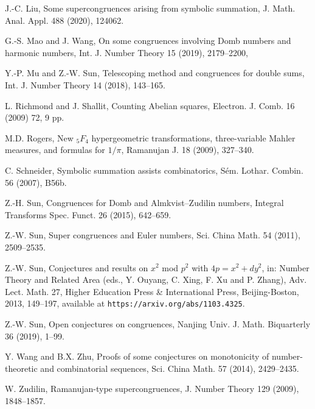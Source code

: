 \documentclass[12pt]{article}
\numberwithin{equation}{section}
\begin{document}
\begin{thebibliography}{99}
J.-C. Liu, Some supercongruences arising from symbolic summation,
J. Math. Anal. Appl. 488 (2020), 124062.

G.-S. Mao and J. Wang, On some congruences involving Domb numbers and harmonic numbers, Int. J. Number Theory 15 (2019), 2179--2200,

Y.-P. Mu and Z.-W. Sun, Telescoping method and congruences for double sums, Int. J. Number Theory 14 (2018), 143--165.

L. Richmond and J. Shallit, Counting Abelian squares, Electron. J. Comb. 16 (2009) 72, 9 pp.

M.D. Rogers, New $_5F_4$ hypergeometric transformations, three-variable Mahler measures, and formulas for $1/\pi$, Ramanujan J. 18 (2009), 327--340.

C. Schneider, Symbolic summation assists combinatorics, S\'em.
    Lothar. Combin. 56 (2007), B56b.

Z.-H. Sun, Congruences for Domb and Almkvist--Zudilin numbers,
Integral Transforms Spec. Funct. 26 (2015), 642--659.

Z.-W. Sun, Super congruences and Euler numbers, Sci. China Math. 54
    (2011), 2509--2535.

Z.-W. Sun, Conjectures and results on $x^2$ mod $p^2$ with $4p = x^2 + dy^2$, in: Number Theory and Related Area (eds., Y. Ouyang, C. Xing, F. Xu and P. Zhang), Adv. Lect. Math. 27, Higher Education Press \& International Press, Beijing-Boston, 2013, 149--197, available at {\tt https://arxiv.org/abs/1103.4325}.

Z.-W. Sun, Open conjectures on congruences, Nanjing Univ. J. Math. Biquarterly 36 (2019), 1--99.

Y. Wang and B.X. Zhu, Proofs of some conjectures on monotonicity of number-theoretic and combinatorial sequences, Sci. China Math. 57 (2014), 2429--2435.

W. Zudilin, Ramanujan-type supercongruences, J. Number Theory 129 (2009), 1848--1857.

\end{thebibliography}
\end{document}
